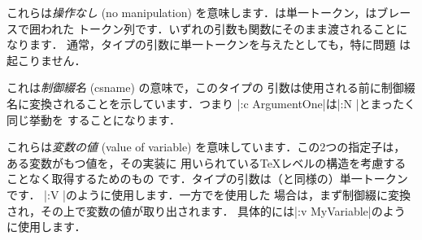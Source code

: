 \documentclass[uplatex,dvipdfmx,full,kernel]{wtpl3doc}
\begin{document}
\begin{description}[style=multiline, leftmargin=3zw]
  \item[\code{N}/\code{n}] これらは\emph{操作なし} (no manipulation)
    を意味します．は単一トークン，はブレースで囲われた
    トークン列です．いずれの引数も関数にそのまま渡されることになります．
    通常，タイプの引数に単一トークンを与えたとしても，特に問題
    は起こりません．
%
  \item[\code{c}] これは\emph{制御綴名} (csname) の意味で，このタイプの
    引数は使用される前に制御綴名に変換されることを示しています．つまり
    |\foo:c {ArgumentOne}|は|\foo:N \ArgumentOne|とまったく同じ挙動を
    することになります．
%
  \item[\code{V}/\code{v}] これらは\emph{変数の値} (value of variable)
    を意味しています．この2つの指定子は，ある変数がもつ値を，その実装に
    用いられている\TeX レベルの構造を考慮することなく取得するためのもの
    です．タイプの引数は（と同様の）単一トークンです．
    |\foo:V \MyVariable|のように使用します．一方でを使用した
    場合は，まず制御綴に変換され，その上で変数の値が取り出されます．
    具体的には|\foo:v {MyVariable}|のように使用します．
%

\end{description}
\end{document}
